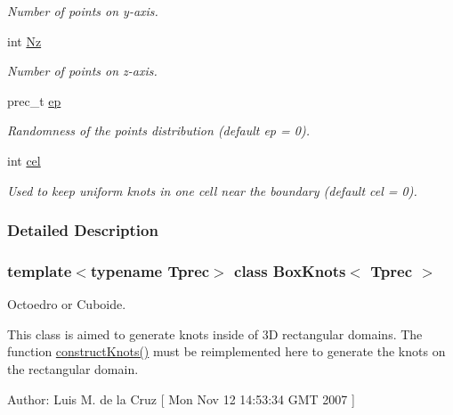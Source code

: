 \begin{CompactItemize}
\begin{CompactList}\small\item\em Number of points on y-axis. \item\end{CompactList}\item 
\hypertarget{classBoxKnots_082da4839e39a88b2de8b3f736bf7539}{
int \hyperlink{classBoxKnots_082da4839e39a88b2de8b3f736bf7539}{Nz}}
\label{classBoxKnots_082da4839e39a88b2de8b3f736bf7539}

\begin{CompactList}\small\item\em Number of points on z-axis. \item\end{CompactList}\item 
\hypertarget{classBoxKnots_3f35480ed2dba837e6ead617e1947473}{
prec\_\-t \hyperlink{classBoxKnots_3f35480ed2dba837e6ead617e1947473}{ep}}
\label{classBoxKnots_3f35480ed2dba837e6ead617e1947473}

\begin{CompactList}\small\item\em Randomness of the points distribution (default ep = 0). \item\end{CompactList}\item 
\hypertarget{classBoxKnots_21099a48a535dc03fb9bc130fc2a541a}{
int \hyperlink{classBoxKnots_21099a48a535dc03fb9bc130fc2a541a}{cel}}
\label{classBoxKnots_21099a48a535dc03fb9bc130fc2a541a}

\begin{CompactList}\small\item\em Used to keep uniform knots in one cell near the boundary (default cel = 0). \item\end{CompactList}\end{CompactItemize}


\subsubsection{Detailed Description}
\subsubsection*{template$<$typename Tprec$>$ class BoxKnots$<$ Tprec $>$}

Octoedro or Cuboide. 

This class is aimed to generate knots inside of 3D rectangular domains. The function \hyperlink{classBoxKnots_fe5f5142f80f351546584e3a0ad8e7eb}{constructKnots()} must be reimplemented here to generate the knots on the rectangular domain. \begin{Desc}
\item[Author:]Luis M. de la Cruz \mbox{[} Mon Nov 12 14:53:34 GMT 2007 \mbox{]} \end{Desc}


